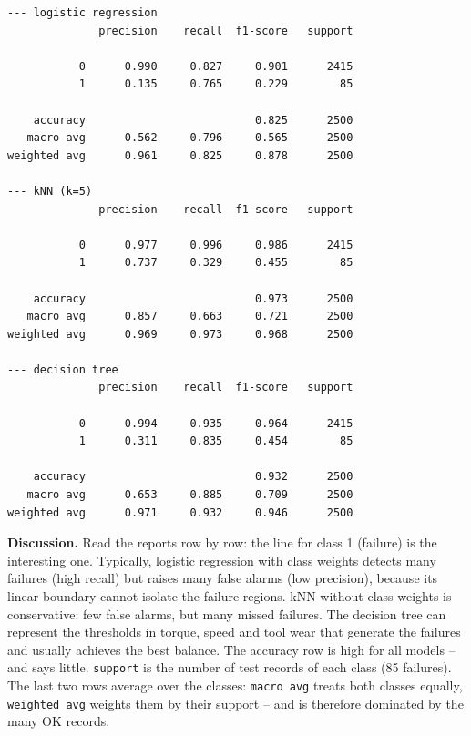 \documentclass[
  letterpaper,
  DIV=11,
  numbers=noendperiod]{scrreprt}
\begin{document}
\begin{verbatim}
--- logistic regression
              precision    recall  f1-score   support

           0      0.990     0.827     0.901      2415
           1      0.135     0.765     0.229        85

    accuracy                          0.825      2500
   macro avg      0.562     0.796     0.565      2500
weighted avg      0.961     0.825     0.878      2500

--- kNN (k=5)
              precision    recall  f1-score   support

           0      0.977     0.996     0.986      2415
           1      0.737     0.329     0.455        85

    accuracy                          0.973      2500
   macro avg      0.857     0.663     0.721      2500
weighted avg      0.969     0.973     0.968      2500

--- decision tree
              precision    recall  f1-score   support

           0      0.994     0.935     0.964      2415
           1      0.311     0.835     0.454        85

    accuracy                          0.932      2500
   macro avg      0.653     0.885     0.709      2500
weighted avg      0.971     0.932     0.946      2500
\end{verbatim}

\textbf{Discussion.} Read the reports row by row: the line for class 1
(failure) is the interesting one. Typically, logistic regression with
class weights detects many failures (high recall) but raises many false
alarms (low precision), because its linear boundary cannot isolate the
failure regions. kNN without class weights is conservative: few false
alarms, but many missed failures. The decision tree can represent the
thresholds in torque, speed and tool wear that generate the failures and
usually achieves the best balance. The accuracy row is high for all
models -- and says little. \texttt{support} is the number of test
records of each class (85 failures). The last two rows average over the
classes: \texttt{macro\ avg} treats both classes equally,
\texttt{weighted\ avg} weights them by their support -- and is therefore
dominated by the many OK records.
\end{document}

